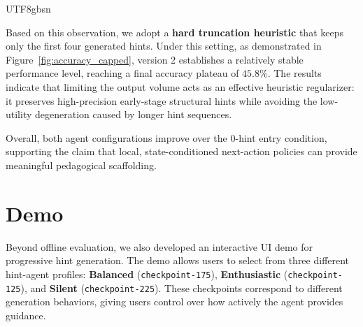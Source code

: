 \documentclass{article}
\begin{document}
\begin{CJK*}{UTF8}{gbsn}
\begin{itemize}
Based on this observation, we adopt a \textbf{hard truncation heuristic} that keeps only the first four generated hints. Under this setting, as demonstrated in Figure~\ref{fig:accuracy_capped}, version 2 establishes a relatively stable performance level, reaching a final accuracy plateau of $45.8\%$. The results indicate that limiting the output volume acts as an effective heuristic regularizer: it preserves high-precision early-stage structural hints while avoiding the low-utility degeneration caused by longer hint sequences.

\end{itemize}


Overall, both agent configurations improve over the 0-hint entry condition, supporting the claim that local, state-conditioned next-action policies can provide meaningful pedagogical scaffolding.


\section{Demo}

Beyond offline evaluation, we also developed an interactive UI demo for progressive hint generation. The demo allows users to select from three different hint-agent profiles: \textbf{Balanced} (\texttt{checkpoint-175}), \textbf{Enthusiastic} (\texttt{checkpoint-125}), and \textbf{Silent} (\texttt{checkpoint-225}). These checkpoints correspond to different generation behaviors, giving users control over how actively the agent provides guidance.


\end{CJK*}
\end{document}
